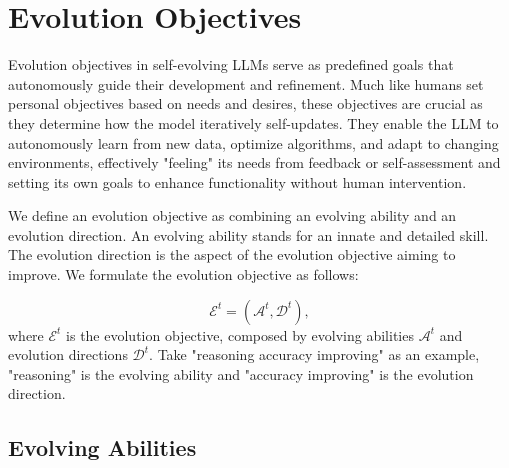 \documentclass[sn-basic, Numbered]{sn-jnl}%
\def\gA{{\mathcal{A}}}
\def\gD{{\mathcal{D}}}
\def\gE{{\mathcal{E}}}
\theoremstyle{thmstyleone}%
\theoremstyle{thmstyletwo}%
\theoremstyle{thmstylethree}%
\begin{document}


% 

\section{Evolution Objectives}
\label{sec:objective}
Evolution objectives in self-evolving LLMs serve as predefined goals that autonomously guide their development and refinement. Much like humans set personal objectives based on needs and desires, these objectives are crucial as they determine how the model iteratively self-updates. They enable the LLM to autonomously learn from new data, optimize algorithms, and adapt to changing environments, effectively "feeling" its needs from feedback or self-assessment and setting its own goals to enhance functionality without human intervention. 

We define an evolution objective as combining an evolving ability and an evolution direction. An evolving ability stands for an innate and detailed skill. The evolution direction is the aspect of the evolution objective aiming to improve. We formulate the evolution objective as follows:

\begin{equation}
    \gE^{t} = ( \gA^{t}, \gD^{t} ), %
\end{equation}
where $ \gE^{t}$ is the evolution objective, composed by evolving abilities $\gA^{t}$ and  evolution directions $\gD^{t}$. Take "reasoning accuracy improving" as an example, "reasoning" is the evolving ability and "accuracy improving" is the evolution direction.

\subsection{Evolving Abilities}
\end{document}
